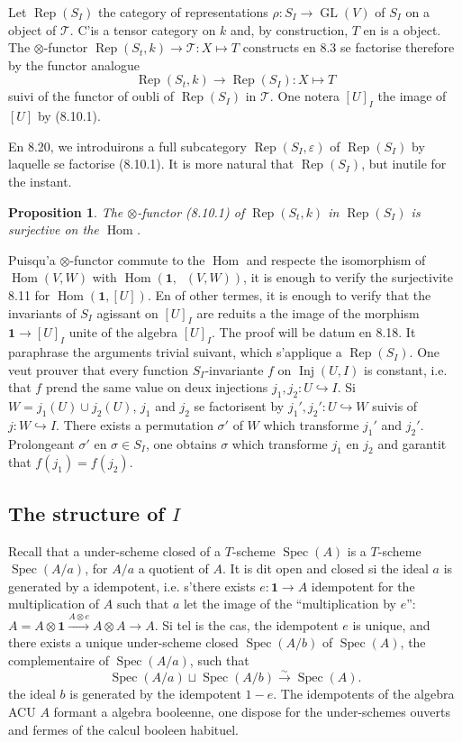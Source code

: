 \documentclass[11pt,a4paper]{article}
\theoremstyle{plain}
\newtheorem{proposition}[theorem]{Proposition}
\theoremstyle{definition}
\DeclareMathOperator{\Hom}{Hom}
\DeclareMathOperator{\Spec}{Spec}
\DeclareMathOperator{\Rep}{Rep}
\DeclareMathOperator{\Inj}{Inj}
\DeclareMathOperator{\GL}{GL}
\newcommand{\eps}{\varepsilon}
\newcommand{\isom}{\xrightarrow{\sim}}
\newcommand{\inj}{\hookrightarrow}
\DeclareMathOperator{\iHom}{\underline{Hom}}
\begin{document}
Let $\Rep(S_I)$ the category of representations $\rho : S_I \to \GL(V)$ of $S_I$ on a object of $\mathcal{T}$. C'is a tensor category on $k$ and, by construction, $T$ en is a object. The $\otimes$-functor $\Rep(S_t, k) \to \mathcal{T} : X \longmapsto T$ constructs en 8.3 se factorise therefore by the functor analogue
\begin{equation}
\Rep(S_t, k) \to \Rep(S_I) : X \longmapsto T \tag{8.10.1}
\end{equation}
suivi of the functor of oubli of $\Rep(S_I)$ in $\mathcal{T}$. One notera $[U]_I$ the image of $[U]$ by (8.10.1).

En 8.20, we introduirons a full subcategory $\Rep(S_I, \eps)$ of $\Rep(S_I)$ by laquelle se factorise (8.10.1). It is more natural that $\Rep(S_I)$, but inutile for the instant.

\begin{proposition}
The $\otimes$-functor (8.10.1) of $\Rep(S_t, k)$ in $\Rep(S_I)$ is surjective on the $\Hom$.
\end{proposition}

Puisqu'a $\otimes$-functor commute to the $\Hom$ and respecte the isomorphism of $\Hom(V, W)$ with $\Hom(\mathbf{1}, \iHom(V, W))$, it is enough to verify the surjectivite 8.11 for $\Hom(\mathbf{1}, [U])$. En of other termes, it is enough to verify that the invariants of $S_I$ agissant on $[U]_I$ are reduits a the image of the morphism $\mathbf{1} \to [U]_I$ unite of the algebra $[U]_I$. The proof will be datum en 8.18. It paraphrase the arguments trivial suivant, which s'applique a $\Rep(S_I)$. One veut prouver that every function $S_I$-invariante $f$ on $\Inj(U, I)$ is constant, i.e. that $f$ prend the same value on deux injections $j_1, j_2 : U \inj I$. Si $W = j_1(U) \cup j_2(U)$, $j_1$ and $j_2$ se factorisent by $j_1', j_2' : U \inj W$ suivis of $j : W \inj I$. There exists a permutation $\sigma'$ of $W$ which transforme $j_1'$ and $j_2'$. Prolongeant $\sigma'$ en $\sigma \in S_I$, one obtains $\sigma$ which transforme $j_1$ en $j_2$ and garantit that $f(j_1) = f(j_2)$.

\subsection{The structure of $I$}
Recall that a under-scheme closed of a $T$-scheme $\Spec(A)$ is a $T$-scheme $\Spec(A/a)$, for $A/a$ a quotient of $A$. It is dit open and closed si the ideal $a$ is generated by a idempotent, i.e. s'there exists $e : \mathbf{1} \to A$ idempotent for the multiplication of $A$ such that $a$ let the image of the ``multiplication by $e$'': $A = A \otimes \mathbf{1} \xrightarrow{A \otimes e} A \otimes A \longrightarrow A$. Si tel is the cas, the idempotent $e$ is unique, and there exists a unique under-scheme closed $\Spec(A/b)$ of $\Spec(A)$, the complementaire of $\Spec(A/a)$, such that
\[
\Spec(A/a) \sqcup \Spec(A/b) \isom \Spec(A).
\]
the ideal $b$ is generated by the idempotent $1 - e$. The idempotents of the algebra ACU $A$ formant a algebra booleenne, one dispose for the under-schemes ouverts and fermes of the calcul booleen habituel.
\end{document}
